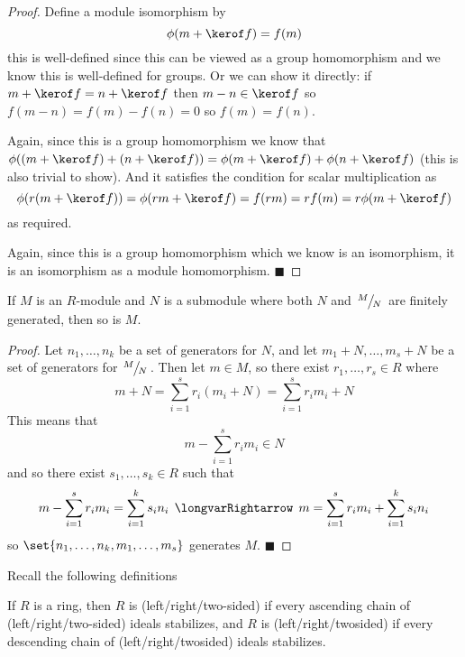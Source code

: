 \documentclass[10pt]{article}
\def\implies{\,\mathrel{\longvarRightarrow}\,}
\def\qed{\hskip1cm\hbox{}\hfill$\blacksquare$}
\begin{document}
\begin{proof}

    Define a module isomorphism by
    \[ \phi(m+\kerof f) = f(m) \]
    this is well-defined since this can be viewed as a group homomorphism and we know this is well-defined for groups.
    Or we can show it directly: if $m+\kerof f=n+\kerof f$ then $m-n\in\kerof f$ so $f(m-n)=f(m)-f(n)=0$ so $f(m)=f(n)$.

    Again, since this is a group homomorphism we know that $\phi((m+\kerof f)+(n+\kerof f))=\phi(m+\kerof f)+\phi(n+\kerof f)$ (this is also trivial to show).
    And it satisfies the condition for scalar multiplication as
    \[ \phi(r(m+\kerof f)) = \phi(rm+\kerof f) = f(rm) = rf(m) = r\phi(m+\kerof f) \]
    as required.

    Again, since this is a group homomorphism which we know is an isomorphism, it is an isomorphism as a module homomorphism.
    \qed

\end{proof}

\begin{prop*}

    If $M$ is an $R$-module and $N$ is a submodule where both $N$ and $\slfrac MN$ are finitely generated, then so is $M$.

\end{prop*}

\begin{proof}

    Let $n_1,\dots,n_k$ be a set of generators for $N$, and let $m_1+N,\dots,m_s+N$ be a set of generators for $\slfrac MN$.
    Then let $m\in M$, so there exist $r_1,\dots,r_s\in R$ where
    \[ m+N = \sum_{i=1}^s r_i(m_i + N) = \sum_{i=1}^s r_im_i + N \]
    This means that
    \[ m - \sum_{i=1}^s r_im_i \in N \]
    and so there exist $s_1,\dots,s_k\in R$ such that
    \[ m - \sum_{i=1}^s r_im_i = \sum_{i=1}^k s_in_i \implies m = \sum_{i=1}^s r_im_i + \sum_{i=1}^k s_in_i \]
    so $\set{n_1,\dots,n_k,m_1,\dots,m_s}$ generates $M$.
    \qed

\end{proof}

Recall the following definitions

\begin{defn*}

    If $R$ is a ring, then $R$ is (left/right/two-sided)  if every ascending chain of (left/right/two-sided) ideals stabilizes, and $R$ is (left/right/twosided)  if every
    descending chain of (left/right/twosided) ideals stabilizes.

\end{defn*}
\end{document}
